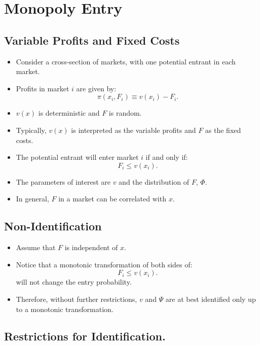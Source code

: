 \documentclass[]{book}
\providecommand{\tightlist}{%
  \setlength{\itemsep}{0pt}\setlength{\parskip}{0pt}}
\begin{document}
\section{Monopoly Entry}\label{monopoly-entry}

\subsection{Variable Profits and Fixed
Costs}\label{variable-profits-and-fixed-costs}

\begin{itemize}
\item
  Consider a cross-section of markets, with one potential entrant in
  each market.
\item
  Profits in market \(i\) are given by: \[
  \pi(x_i, F_i) \equiv v(x_i) - F_i.
  \]
\item
  \(v(x)\) is deterministic and \(F\) is random.
\item
  Typically, \(v(x)\) is interpreted as the variable profits and \(F\)
  as the fixed costs.
\item
  The potential entrant will enter market \(i\) if and only if: \[
  F_i \le v(x_i).
  \]
\item
  The parameters of interest are \(v\) and the distribution of \(F\),
  \(\Phi\).
\item
  In general, \(F\) in a market can be correlated with \(x\).
\end{itemize}

\subsection{Non-Identification}\label{non-identification}

\begin{itemize}
\tightlist
\item
  Assume that \(F\) is independent of \(x\).
\item
  Notice that a monotonic transformation of both sides of: \[
  F_i \le v(x_i).
  \] will not change the entry probability.
\item
  Therefore, without further restrictions, \(v\) and \(\Psi\) are at
  best identified only up to a monotonic transformation.
\end{itemize}

\subsection{Restrictions for
Identification.}\label{restrictions-for-identification.}
\end{document}

